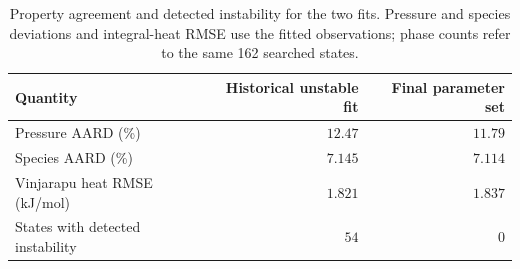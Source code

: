 \begin{table}[pos=!htbp]\small\setlength{\tabcolsep}{3pt}\centering
\caption{Property agreement and detected instability for the two fits. Pressure and species deviations and integral-heat RMSE use the fitted observations; phase counts refer to the same 162 searched states.}\label{tab:two-fit-comparison}
\begin{tabular}{@{}lrr@{}}
\toprule
Quantity & Historical unstable fit & Final parameter set \\
\midrule
Pressure AARD (\%) & $12.47$ & $11.79$ \\
Species AARD (\%) & $7.145$ & $7.114$ \\
Vinjarapu heat RMSE (kJ/\allowbreak{}mol) & $1.821$ & $1.837$ \\
States with detected instability & $54$ & $0$ \\
\bottomrule
\end{tabular}
\end{table}
